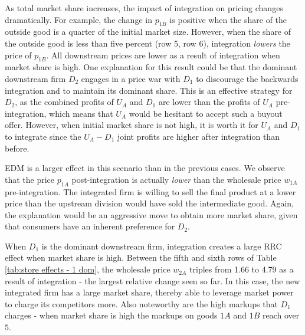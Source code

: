 \documentclass[12pt]{article}%
\begin{document}
As total market share increases, the impact of integration on pricing changes dramatically. For example, the change in $p_{1B}$ is positive when the share of the outside good is a quarter of the initial market size. However, when the share of the outside good is less than five percent (row 5, row 6), integration \textit{lowers} the price of $p_{1B}$. All downstream prices are lower as a result of integration when market share is high. One explanation for this result could be that the dominant downstream firm $D_2$ engages in a price war with $D_1$ to discourage the backwards integration and to maintain its dominant share. This is an effective strategy for $D_2$, as the combined profits of $U_A$ and $D_1$ are lower than the profits of $U_A$ pre-integration, which means that $U_A$ would be hesitant to accept such a buyout offer. However, when initial market share is not high, it is worth it for $U_A$ and $D_1$ to integrate since the $U_A-D_1$ joint profits are higher after integration than before.

EDM is a larger effect in this scenario than in the previous cases. We observe that the price $p_{1A}$ post-integration is actually \textit{lower} than the wholesale price $w_{1A}$ pre-integration. The integrated firm is willing to sell the final product at a lower price than the upstream division would have sold the intermediate good. Again, the explanation would be an aggressive move to obtain more market share, given that consumers have an inherent preference for $D_2$.

When $D_1$ is the dominant downstream firm, integration creates a large RRC effect when market share is high. Between the fifth and sixth rows of Table \ref{tab:store effects - 1 dom}, the wholesale price $w_{2A}$ triples from 1.66 to 4.79 as a result of integration - the largest relative change seen so far. In this case, the new integrated firm has a large market share, thereby able to leverage market power to charge its competitors more. Also noteworthy are the high markups that $D_1$ charges - when market share is high the markups on goods $1A$ and $1B$ reach over $5$.
\end{document}
